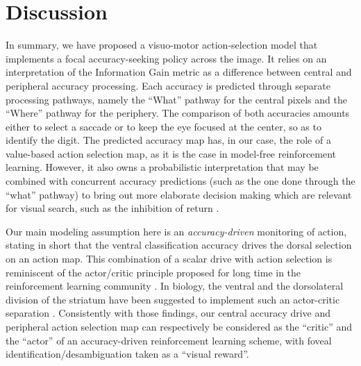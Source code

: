 
\section*{Discussion} \label{sec:discussion}

In summary, we have proposed a visuo-motor action-selection model that implements a focal accuracy-seeking policy across the image. It relies on an interpretation of the Information Gain metric as a difference between central and peripheral accuracy processing. Each accuracy is predicted through separate processing pathways, namely the ``What'' pathway for the central pixels and the ``Where'' pathway for the periphery.  The comparison of both accuracies amounts either to select a saccade or to keep the eye focused at the center, so as to identify the digit. The predicted accuracy map has, in our case, the role of a value-based action selection map, as it is the case in model-free reinforcement learning. However, it also owns a probabilistic interpretation that may be combined with concurrent accuracy predictions (such as the one done through the ``what'' pathway) to bring out more elaborate decision making which are relevant for visual search, such as the inhibition of return \cite{Itti01}. 

Our main modeling assumption here is an \emph{accuracy-driven} monitoring of action, stating in short that the ventral classification accuracy drives the dorsal selection on an action map. This combination of a scalar drive with action selection is reminiscent of the actor/critic principle proposed for long time in the reinforcement learning community \cite{sutton1998reinforcement}. In biology, the ventral and the dorsolateral division of the striatum have been suggested to implement such an actor-critic separation \cite{joel2002actor,takahashi2008silencing}. Consistently with those findings, our central accuracy drive and peripheral action selection map can respectively be considered as the ``critic'' and the ``actor'' of an accuracy-driven reinforcement learning scheme, with foveal identification/desambiguation taken as a ``visual reward''.

